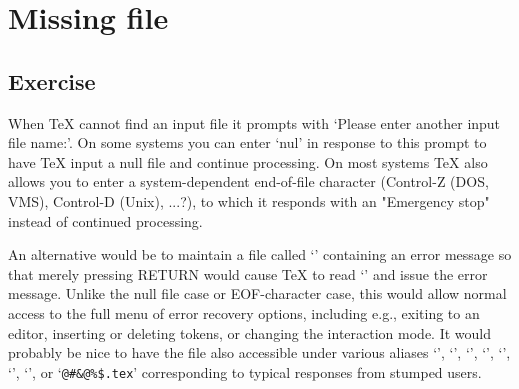 \begin{comment}
Michael Downes %
mjd@math.ams.org (Internet) ASCII 32--54,55--126: !"#$%
789:;<=>?@ABCDEFGHIJKLMNOPQRSTUVWXYZ[\]^_`abcdefghijklmnopqrstuvwxyz{|}~

Date: 28 Jan 1994 08:01:12 -0500 (EST)
From: Michael Downes <MJD@MATH.AMS.ORG>
Subject: Around the Bend #16, answers, correction
To: info-tex@shsu.edu

Instead of

  \font\twelverm = \fontname\tenrm\space scaled 1200

read

  \font\tenrm = \fontname\tenrm\space scaled 1200

The latter line is what I originally wrote but I changed it in an obtuse
moment a day later, forgetting the very point it was supposed to
illustrate.
\end{comment}


\chapter{Missing  file}

\section{Exercise}

\begin{comment}
Date: 14 Jan 1994 12:44:13 -0500 (EST)
From: Michael Downes <MJD@MATH.AMS.ORG>
Subject: Around the Bend #17
To: info-tex@shsu.edu
X-ListName: TeX-Related Network Discussion List <INFO-TeX@SHSU.edu>
\end{comment}


When TeX cannot find an input file it prompts with `Please enter another
input file name:'. On some systems you can enter `nul' in response to
this prompt to have TeX input a null file and continue processing. On
most systems TeX also allows you to enter a system-dependent end-of-file
character (Control-Z (DOS, VMS), Control-D (Unix), ...?), to which it
responds with an "Emergency stop" instead of continued processing.

An alternative would be to maintain a file called `' containing an
error message so that merely pressing RETURN would cause TeX to read
`' and issue the error message. Unlike the null file case or
EOF-character case, this would allow normal access to the full menu of
error recovery options, including e.g., exiting to an editor, inserting
or deleting tokens, or changing the interaction mode. It would probably
be nice to have the file also accessible under various aliases `',
`', `', `', `', 
`', `', or
`\verb?@#&@%$.tex?' corresponding to typical responses from stumped users.

